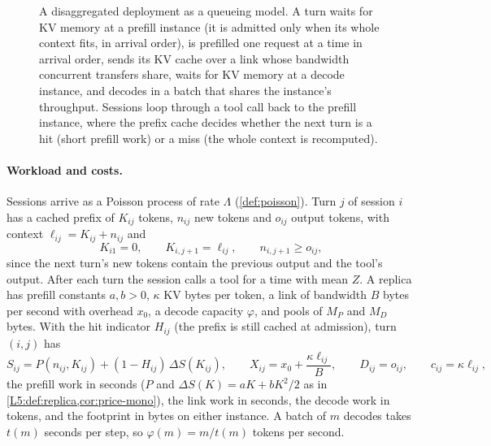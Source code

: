 \begin{figure}[t]
\caption{A disaggregated deployment as a queueing model. A turn waits for KV memory
at a prefill instance (it is admitted only when its whole context fits, in arrival
order), is prefilled one request at a time in arrival order, sends its KV cache over a
link whose bandwidth concurrent transfers share, waits for KV memory at a decode
instance, and decodes in a batch that shares the instance's throughput. Sessions loop
through a tool call back to the prefill instance, where the prefix cache decides
whether the next turn is a hit (short prefill work) or a miss (the whole context is
recomputed).}
\label{fig:deployment}
\end{figure}

\paragraph{Workload and costs.}\label{L6:def:workload} Sessions arrive as a Poisson process of rate $\Lambda$ (\cref{def:poisson}). Turn $j$
of session $i$ has a cached prefix of $K_{ij}$ tokens, $n_{ij}$ new tokens and
$o_{ij}$ output tokens, with context $\ell_{ij}=K_{ij}+n_{ij}$ and
\begin{equation}\label{L6:eq:context}
  K_{i1}=0,\qquad K_{i,j+1}=\ell_{ij},\qquad n_{i,j+1}\ge o_{ij},
\end{equation}
since the next turn's new tokens contain the previous output and the tool's output.
After each turn the session calls a tool for a time with mean $Z$. A replica has
prefill constants $a,b>0$, $\kappa$ KV bytes per token, a link of bandwidth $B$ bytes
per second with overhead $x_0$, a decode capacity $\varphi$, and pools of $M_P$ and
$M_D$ bytes. With the hit indicator $H_{ij}$ (the prefix is still cached at
admission), turn $(i,j)$ has
\begin{equation}\label{L6:eq:work}
  S_{ij}=P(n_{ij},K_{ij})+(1-H_{ij})\,\Delta S(K_{ij}),\qquad
  X_{ij}=x_0+\frac{\kappa\ell_{ij}}{B},\qquad D_{ij}=o_{ij},\qquad c_{ij}=\kappa\ell_{ij},
\end{equation}
the prefill work in seconds ($P$ and $\Delta S(K)=aK+bK^2/2$ as in
\cref{L5:def:replica,cor:price-mono}), the link work in seconds, the decode work in
tokens, and the footprint in bytes on either instance. A batch of $m$ decodes takes
$t(m)$ seconds per step, so $\varphi(m)=m/t(m)$ tokens per second.

